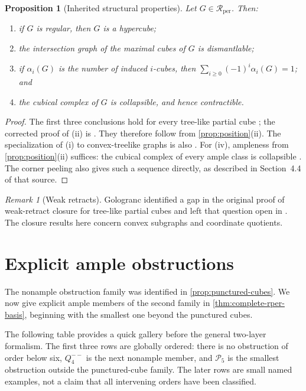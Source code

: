 \documentclass[11pt]{article}
\newtheorem{proposition}[theorem]{Proposition}
\theoremstyle{definition}
\theoremstyle{remark}
\newtheorem{remark}[theorem]{Remark}
\newcommand{\Rper}{\mathcal R_{\mathrm{per}}}
\begin{document}
\begin{proposition}[Inherited structural properties]
\label{prop:inherited-properties}
Let \(G\in\Rper\).  Then:
\begin{enumerate}[label=\textup{(\roman*)}]
  \item if \(G\) is regular, then \(G\) is a hypercube;
  \item the intersection graph of the maximal cubes of \(G\) is
        dismantlable;
  \item if \(\alpha_i(G)\) is the number of induced \(i\)-cubes, then
        \(\sum_{i\ge0}(-1)^i\alpha_i(G)=1\); and
  \item the cubical complex of \(G\) is collapsible, and hence contractible.
\end{enumerate}
\end{proposition}

\begin{proof}
The first three conclusions hold for every tree-like partial cube
\cite{BresarImrichKlavzar03}; the corrected proof of (ii) is
\cite[Corollary~15]{Gologranc14treehamming}.  They therefore follow from
\cref{prop:position}(ii). The specialization of (i) to convex-treelike
graphs is also \cite[Proposition~5.9]{Polat12treelike}.
For (iv), ampleness from \cref{prop:position}(ii) suffices:
the cubical complex of every ample class is collapsible
\cite[Proposition~4.12]{ChalopiChepoiMoran22}. The corner peeling also gives
such a sequence directly, as described in Section~4.4 of that source.
\end{proof}

\begin{remark}[Weak retracts]
Gologranc identified a gap in the original proof of weak-retract closure
for tree-like partial cubes and left that question open in
\cite{Gologranc14treehamming}.  The closure results here concern convex
subgraphs and coordinate quotients.
\end{remark}

\section{Explicit ample obstructions}
\label{sec:obstructions}

The nonample obstruction family was identified in
\cref{prop:punctured-cubes}.  We now give explicit ample members of the
second family in \cref{thm:complete-rper-basis}, beginning with the smallest
one beyond the punctured cubes.

The following table provides a quick gallery before the general two-layer
formalism.  The first three rows are globally ordered: there is no
obstruction of order below six, \(Q_4^{--}\) is the next nonample member, and
\(\mathcal P_5\) is the smallest obstruction outside the punctured-cube
family.  The later rows are small named examples, not a claim that all
intervening orders have been classified.
\end{document}
